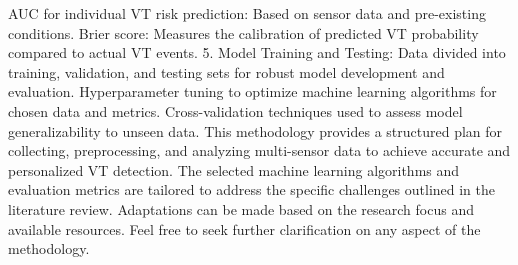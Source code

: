 AUC for individual VT risk prediction: Based on sensor data and pre-existing conditions.
Brier score: Measures the calibration of predicted VT probability compared to actual VT events.
5. Model Training and Testing:
Data divided into training, validation, and testing sets for robust model development and evaluation.
Hyperparameter tuning to optimize machine learning algorithms for chosen data and metrics.
Cross-validation techniques used to assess model generalizability to unseen data.
This methodology provides a structured plan for collecting, preprocessing, and analyzing multi-sensor data to achieve accurate and personalized VT detection. The selected machine learning algorithms and evaluation metrics are tailored to address the specific challenges outlined in the literature review. Adaptations can be made based on the research focus and available resources. Feel free to seek further clarification on any aspect of the methodology.